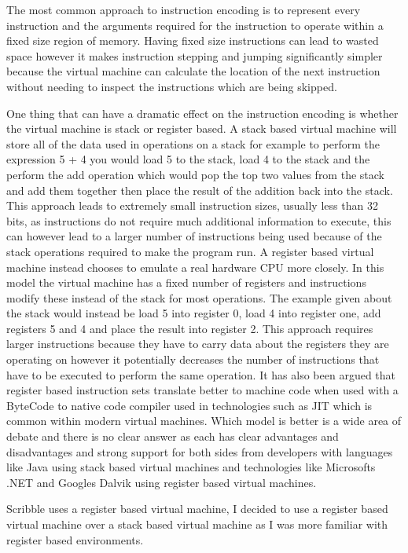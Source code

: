 \documentclass[]{final_report}
\begin{document}
The most common approach to instruction encoding is to represent every instruction and the arguments required for the instruction to operate within a fixed size region of memory. Having fixed size instructions can lead to wasted space however it makes instruction stepping and jumping significantly simpler because the virtual machine can calculate the location of the next instruction without needing to inspect the instructions which are being skipped.

One thing that can have a dramatic effect on the instruction encoding is whether the virtual machine is stack or register based. A stack based virtual machine will store all of the  data used in operations on a stack for example to perform the expression 5 + 4 you would load 5 to the stack, load 4 to the stack and the perform the add operation which would pop the top two values from the stack and add them together then place the result of the addition back into the stack. This approach leads to extremely small instruction sizes, usually less than 32 bits, as instructions do not require much additional information to execute, this can however lead to a larger number of instructions being used because of the stack operations required to make the program run. A register based virtual machine instead chooses to emulate a real hardware CPU more closely. In this model the virtual machine has a fixed number of registers and instructions modify these instead of the stack for most operations. The example given about the stack would instead be load 5 into register 0, load 4 into register one, add registers 5 and 4 and place the result into register 2. This approach requires larger instructions because they have to carry data about the registers they are operating on however it potentially decreases the number of instructions that have to be executed to perform the same operation. It has also been argued that register based instruction sets translate better to machine code when used with a ByteCode to native code compiler used in technologies such as JIT which is common within modern virtual machines. Which model is better is a wide area of debate and there is no clear answer as each has clear advantages and disadvantages and strong support for both sides from developers with languages like Java using stack based virtual machines and technologies like Microsofts .NET and Googles Dalvik using register based virtual machines.

Scribble uses a register based virtual machine, I decided to use a register based virtual machine over a stack based virtual machine as I was more familiar with register based environments.
\end{document}
